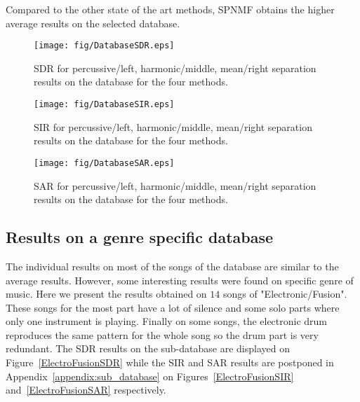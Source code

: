 Compared to the other state of the art methods, SPNMF obtains the higher average results on the selected database. 


\begin{figure}[h]

  \centering 
  \texttt{[image: fig/DatabaseSDR.eps]}
  \caption{\label{DatabaseSDR} SDR for percussive/left, harmonic/middle, mean/right separation results on the database for the four methods.}
  
\end{figure}

\begin{figure}[h]

  \centering 
  \texttt{[image: fig/DatabaseSIR.eps]}
  \caption{\label{DatabaseSIR} SIR for percussive/left, harmonic/middle, mean/right separation results on the database for the four methods.}
  
\end{figure}

\begin{figure}[h]

  \centering 
  \texttt{[image: fig/DatabaseSAR.eps]}
  \caption{\label{DatabaseSAR} SAR for percussive/left, harmonic/middle, mean/right separation results on the database for the four methods.}
  
\end{figure}




\subsection{Results on a genre specific database}
\label{sec:subdata}

The individual results on most of the songs of the database are similar to the average results. However, some interesting results were found on specific genre of music. Here we present the results obtained on $14$ songs of "Electronic/Fusion". These songs for the most part have a lot of silence and some solo parts where only one instrument is playing. Finally on some songs, the electronic drum reproduces the same pattern for the whole song so the drum part is very redundant. The SDR results on the sub-database are displayed on Figure~\ref{ElectroFusionSDR} while the SIR and SAR results are postponed in Appendix~\ref{appendix:sub_database} on Figures~\ref{ElectroFusionSIR} and~\ref{ElectroFusionSAR} respectively. 


